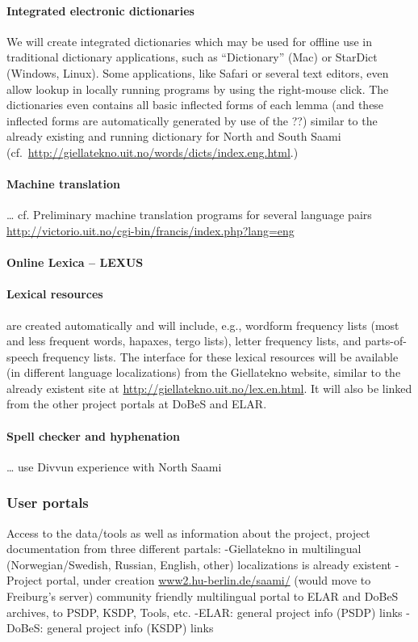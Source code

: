 \documentclass[a4paper,12pt]{article}
\begin{document}
\paragraph{Integrated electronic dictionaries}
We will create integrated dictionaries which may be used for offline use in traditional dictionary applications, such as “Dictionary” (Mac) or StarDict (Windows, Linux). Some applications, like Safari or several text editors, even allow lookup in locally running programs by using the right-mouse click. The dictionaries even contains all basic inflected forms of each lemma (and these inflected forms are automatically generated by use of the ??) similar to the already existing and running dictionary for North and South Saami (cf.~\url{http://giellatekno.uit.no/words/dicts/index.eng.html}.)

\paragraph{Machine translation}%
… cf. Preliminary machine translation programs for several language pairs \url{http://victorio.uit.no/cgi-bin/francis/index.php?lang=eng}

\paragraph{Online Lexica – LEXUS}%

\paragraph{Lexical resources} are created automatically and will include, e.g., wordform frequency lists (most and less frequent words, hapaxes, tergo lists), letter frequency lists, and parts-of-speech frequency lists. The interface for these lexical resources will be available (in different language localizations) from the Giellatekno website, similar to the already existent site at \url{http://giellatekno.uit.no/lex.en.html}. It will also be linked from the other project portals at DoBeS and ELAR.

\paragraph{Spell checker and hyphenation}%
… use Divvun experience with North Saami

\subsubsection{User portals}
Access to the data/tools as well as information about the project, project documentation from three different partals:
-Giellatekno in multilingual (Norwegian/Swedish, Russian, English, other) localizations is already existent
-Project portal, under creation \url{www2.hu-berlin.de/saami/} (would move to Freiburg's server) community friendly multilingual portal to ELAR and DoBeS archives, to PSDP, KSDP, Tools, etc. 
-ELAR: general project info (PSDP) links
-DoBeS: general project info (KSDP) links
\end{document}
